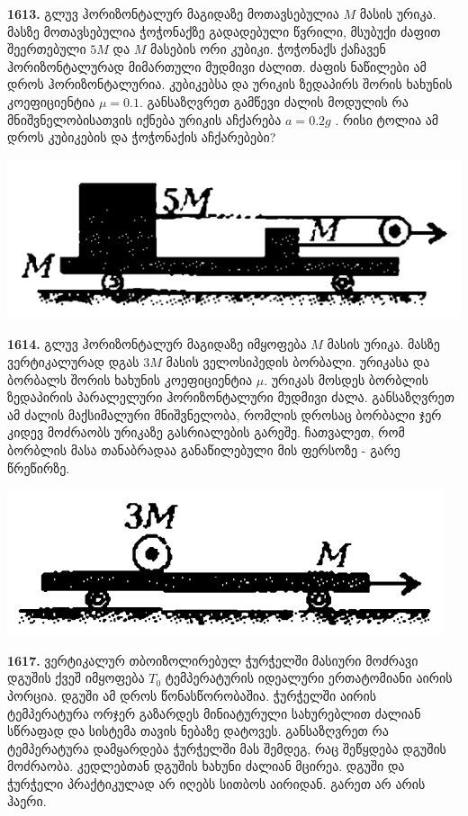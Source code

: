 \documentclass[12pt,a4paper,]{report}
\begin{document}
\textbf{1613.} გლუვ ჰორიზონტალურ მაგიდაზე მოთავსებულია $M$ მასის ურიკა. მასზე მოთავსებულია ჭოჭონაქზე გადადებული წვრილი, მსუბუქი ძაფით შეერთებული $5M$ და $M$ მასების ორი კუბიკი. ჭოჭონაქს ქაჩავენ ჰორიზონტალურად მიმართული მუდმივი ძალით. ძაფის ნაწილები ამ დროს ჰორიზონტალურია. კუბიკებსა და ურიკის ზედაპირს შორის ხახუნის კოეფიციენტია $\mu=0.1$. განსაზღვრეთ გამწევი ძალის მოდულის რა მნიშვნელობისათვის იქნება ურიკის აჩქარება $a=0.2g$ . რისი ტოლია ამ დროს კუბიკების და ჭოჭონაქის აჩქარებები?                         
		\begin{center}
			\includegraphics[scale=0.4]{images/F1613.png}
		\end{center}

\textbf{1614.} გლუვ ჰორიზონტალურ მაგიდაზე იმყოფება $M$ მასის ურიკა. მასზე ვერტიკალურად დგას $3M$ მასის ველოსიპედის ბორბალი. ურიკასა და ბორბალს შორის ხახუნის კოეფიციენტია $\mu$. ურიკას მოსდეს ბორბლის ზედაპირის პარალელური ჰორიზონტალური მუდმივი ძალა. განსაზღვრეთ ამ ძალის მაქსიმალური მნიშვნელობა, რომლის დროსაც ბორბალი ჯერ კიდევ მოძრაობს ურიკაზე გასრიალების გარეშე. ჩათვალეთ, რომ ბორბლის მასა თანაბრადაა განაწილებული მის ფერსოზე - გარე წრეწირზე.         
		\begin{center}
			\includegraphics[scale=0.4]{images/F1614.png}
		\end{center}

\textbf{1617.} ვერტიკალურ თბოიზოლირებულ ჭურჭელში მასიური მოძრავი დგუშის ქვეშ იმყოფება $T_0$ ტემპერატურის იდეალური ერთატომიანი აირის პორცია. დგუში ამ დროს წონასწორობაშია. ჭურჭელში აირის ტემპერატურა ორჯერ გაზარდეს  მინიატურული სახურებლით ძალიან სწრაფად და სისტემა თავის ნებაზე დატოვეს. განსაზღვრეთ რა ტემპერატურა დამყარდება ჭურჭელში მას შემდეგ, რაც შეწყდება დგუშის მოძრაობა. კედლებთან დგუშის ხახუნი ძალიან მცირეა. დგუში და ჭურჭელი პრაქტიკულად არ იღებს სითბოს აირიდან. გარეთ არ არის ჰაერი.
\end{document}
